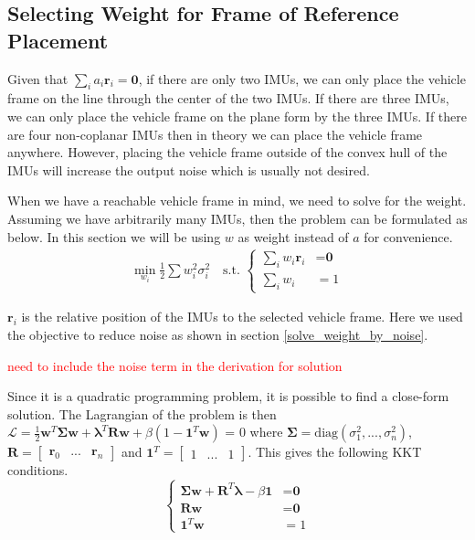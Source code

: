 \documentclass[conference]{IEEEtran}
\begin{document}
\subsection{Selecting Weight for Frame of Reference Placement}

Given that $\sum_i{a_i \textbf{r}_i} = \textbf{0}$, if there are only two IMUs, we can only place the vehicle frame on the line through the center of the two IMUs. If there are three IMUs, we can only place the vehicle frame on the plane form by the three IMUs. If there are four non-coplanar IMUs then in theory we can place the vehicle frame anywhere. However, placing the vehicle frame outside of the convex hull of the IMUs will increase the output noise which is usually not desired.

When we have a reachable vehicle frame in mind, we need to solve for the weight. Assuming we have arbitrarily many IMUs, then the problem can be formulated as below. In this section we will be using $w$ as weight instead of $a$ for convenience.
\begin{equation}
\begin{split}
    \min_{w_i}{\frac{1}{2} \sum{w_i^2 \sigma_i^2}} \quad \text{s.t. }
    \begin{cases}
      \sum_i{w_i \textbf{r}_i} &= \textbf{0} \\
      \sum_i{w_i} &= 1
    \end{cases}
\end{split}
\end{equation}

$\textbf{r}_i$ is the relative position of the IMUs to the selected vehicle frame. Here we used the objective to reduce noise as shown in section \ref{solve_weight_by_noise}.

\textcolor{red}{need to include the noise term in the derivation for solution}

Since it is a quadratic programming problem, it is possible to find a close-form solution. The Lagrangian of the problem is then $\mathcal{L} = \frac{1}{2}\textbf{w}^T \bm{\Sigma} \textbf{w} + \bm{\lambda}^T \textbf{R}\textbf{w} + \beta \left( 1 - \textbf{1}^T \textbf{w} \right)$ = 0 where $\bm{\Sigma} = \text{diag}(\sigma_1^2, ..., \sigma_n^2)$, $\textbf{R} = \left[\begin{matrix} \textbf{r}_0 & ... & \textbf{r}_n\end{matrix}\right]$ and $\textbf{1}^T = \left[\begin{matrix}1 & ... & 1\end{matrix}\right]$. This gives the following KKT conditions.
\begin{equation}
\begin{cases}
  \bm{\Sigma}\textbf{w} + \textbf{R}^T \bm{\lambda} - \beta \textbf{1} &= \textbf{0} \\
  \textbf{R} \textbf{w} &= \textbf{0} \\
  \textbf{1}^T \textbf{w} &= 1
\end{cases}
\end{equation}
\end{document}

